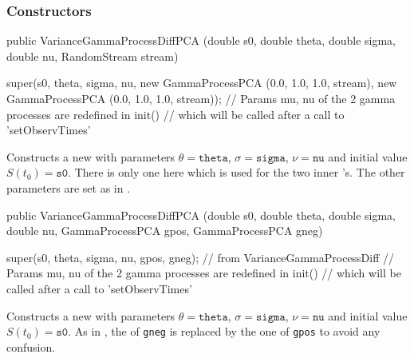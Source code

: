 \subsubsection* {Constructors}
\begin{code}

   public VarianceGammaProcessDiffPCA (double s0, double theta,
                                       double sigma, double nu,
                                       RandomStream stream) \begin{hide} {
     super(s0, theta, sigma, nu, 
	  new GammaProcessPCA (0.0, 1.0, 1.0, stream),
	  new GammaProcessPCA (0.0, 1.0, 1.0, stream));
    // Params mu, nu of the 2 gamma processes are redefined in init()
    // which will be called after a call to 'setObservTimes'
}\end{hide}
\end{code}
\begin{tabb} Constructs a new  with 
parameters  $\theta = \texttt{theta}$, $\sigma = \texttt{sigma}$, $\nu = \texttt{nu}$ 
and initial value $S(t_{0}) = \texttt{s0}$.  There is only
one  here which is
used for the two inner 's.  The other
parameters are set as in .
\end{tabb}
\begin{code}

   public VarianceGammaProcessDiffPCA (double s0, double theta,
                                       double sigma, double nu,
                                       GammaProcessPCA gpos,
                                       GammaProcessPCA gneg) \begin{hide} {
    super(s0, theta, sigma, nu, gpos, gneg); // from VarianceGammaProcessDiff
    // Params mu, nu of the 2 gamma processes are redefined in init()
    // which will be called after a call to 'setObservTimes'
}\end{hide}
\end{code}
\begin{tabb} Constructs a new  with 
parameters  $\theta = \texttt{theta}$, $\sigma = \texttt{sigma}$, $\nu = \texttt{nu}$ 
and initial value $S(t_{0}) = \texttt{s0}$.  As in 
, the 
 of \texttt{gneg} is replaced by
the one of \texttt{gpos} to avoid any confusion.
\end{tabb}

